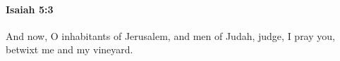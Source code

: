 
		\paragraph{Isaiah 5:3} %
			\label{ISAIAH-5-3}

			And now, O inhabitants of Jerusalem, and men of Judah, judge, I pray you, betwixt me and my vineyard.


